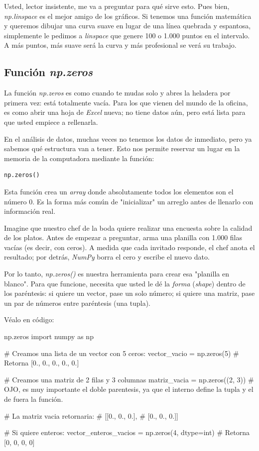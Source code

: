 Usted, lector insistente, me va a preguntar para qué sirve esto. Pues bien, \textit{np.linspace} es el mejor amigo de los gráficos. Si tenemos una función matemática y queremos dibujar una curva suave en lugar de una línea quebrada y espantosa, simplemente le pedimos a \textit{linspace} que genere 100 o 1.000 puntos en el intervalo. A más puntos, más suave será la curva y más profesional se verá su trabajo.


\subsection{Función \textit{np.zeros}}

La función \textit{np.zeros} es como cuando te mudas solo y abres la heladera por primera vez: está totalmente vacía. Para los que vienen del mundo de la oficina, es como abrir una hoja de \textit{Excel} nueva; no tiene datos aún, pero está lista para que usted empiece a rellenarla.

En el análisis de datos, muchas veces no tenemos los datos de inmediato, pero ya sabemos qué estructura van a tener. Esto nos permite reservar un lugar en la memoria de la computadora mediante la función:

\begin{verbatim}
np.zeros()
\end{verbatim}

Esta función crea un \textit{array} donde absolutamente todos los elementos son el número 0. Es la forma más común de "inicializar" un arreglo antes de llenarlo con información real.

\begin{ejemplo}
Imagine que nuestro chef de la boda quiere realizar una encuesta sobre la calidad de los platos. Antes de empezar a preguntar, arma una planilla con 1.000 filas vacías (es decir, con ceros). A medida que cada invitado responde, el chef anota el resultado; por detrás, \textit{NumPy} borra el cero y escribe el nuevo dato.
\end{ejemplo}

Por lo tanto, \textit{np.zeros()} es nuestra herramienta para crear esa "planilla en blanco". Para que funcione, necesita que usted le dé la \textit{forma} (\textit{shape}) dentro de los paréntesis: si quiere un vector, pase un solo número; si quiere una matriz, pase un par de números entre paréntesis (una tupla).

Véalo en código:

\begin{pycode}{np.zeros}
import numpy as np 

# Creamos una lista de un vector con 5 ceros:
vector_vacio = np.zeros(5) # Retorna [0., 0., 0., 0., 0.]

# Creamos una matriz de 2 filas y 3 columnas
matriz_vacia = np.zeros((2, 3)) # OJO, es muy importante el doble parentesis, ya que el interno define la tupla y el de fuera la función.

# La matriz vacia retornaria:
# [[0., 0., 0.],
# [0., 0., 0.]]

# Si quiere enteros:
vector_enteros_vacios = np.zeros(4, dtype=int) # Retorna [0, 0, 0, 0]

\end{pycode}


